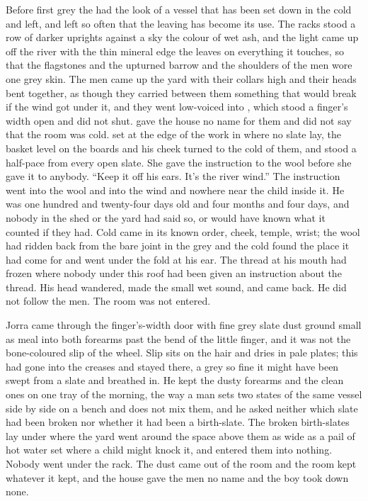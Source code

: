
Before first grey the  had the look of a vessel that has been set down in the cold and left, and left so often that the leaving has become its use. The racks stood a row of darker uprights against a sky the colour of wet ash, and the light came up off the river with the thin mineral edge the  leaves on everything it touches, so that the flagstones and the upturned barrow and the shoulders of the men wore one grey skin. The men came up the yard with their collars high and their heads bent together, as though they carried between them something that would break if the wind got under it, and they went low-voiced into , which stood a finger's width open and did not shut.  gave the house no name for them and did not say that the room was cold.  set  at the edge of the work in  where no slate lay, the basket level on the boards and his cheek turned to the cold of them, and stood a half-pace from every open slate. She gave the instruction to the wool before she gave it to anybody. “Keep it off his ears. It's the river wind.” The instruction went into the wool and into the wind and nowhere near the child inside it. He was one hundred and twenty-four days old and four months and four days, and nobody in the shed or the yard had said so, or would have known what it counted if they had. Cold came in its known order, cheek, temple, wrist; the wool had ridden back from the bare joint in the grey and the cold found the place it had come for and went under the fold at his ear. The thread at his mouth had frozen where nobody under this roof had been given an instruction about the thread. His head wandered, made the small wet sound, and came back. He did not follow the men. The room was not entered.

Jorra came through the finger's-width door with fine grey slate dust ground small as meal into both forearms past the bend of the little finger, and it was not the bone-coloured slip of the wheel. Slip sits on the hair and dries in pale plates; this had gone into the creases and stayed there, a grey so fine it might have been swept from a slate and breathed in. He kept the dusty forearms and the clean ones on one tray of the morning, the way a man sets two states of the same vessel side by side on a bench and does not mix them, and he asked neither which slate had been broken nor whether it had been a birth-slate. The broken birth-slates lay under  where the yard went around the space above them as wide as a pail of hot water set where a child might knock it, and entered them into nothing. Nobody went under the rack. The dust came out of the room and the room kept whatever it kept, and the house gave the men no name and the boy took down none.


